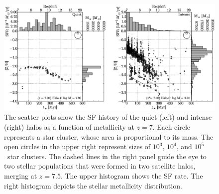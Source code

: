 \documentclass[12pt]{article}
\newcommand{\Ms}{\ifmmode{M_\odot}\else{$M_\odot$}\fi}
\begin{document}
\clearpage
\begin{figure}
\includegraphics[width=\textwidth]{f3.eps}
\caption{\label{fig:pops} The scatter plots show the SF history of the
  quiet (left) and intense (right) halos as a function of metallicity
  at $z=7$.  Each circle represents a star cluster, whose area is
  proportional to its mass.  The open circles in the upper right
  represent sizes of $10^3$, $10^4$, and $10^5$ \Ms~star clusters.
  The dashed lines in the right panel guide the eye to two stellar
  populations that were formed in two satellite halos, merging at
  $z=7.5$.  The upper histogram shows the SF rate.  The right
  histogram depicts the stellar metallicity distribution.}
\end{figure}


%
\end{document}
